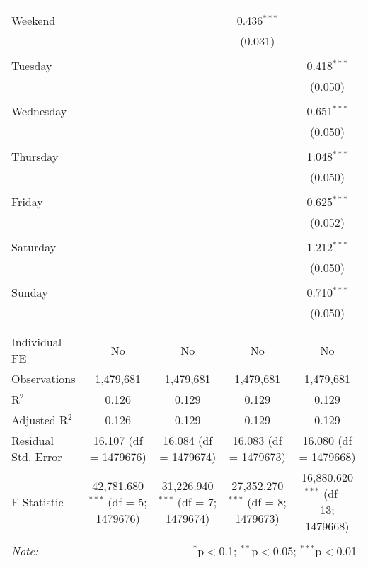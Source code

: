 \documentclass[
]{article}
\begin{document}
\begin{table}[!htbp]
{\begin{tabular}{@{\extracolsep{5pt}}lcccc}
  & & & & \\ 
 Weekend &  &  & 0.436$^{***}$ &  \\ 
  &  &  & (0.031) &  \\ 
  & & & & \\ 
 Tuesday &  &  &  & 0.418$^{***}$ \\ 
  &  &  &  & (0.050) \\ 
  & & & & \\ 
 Wednesday &  &  &  & 0.651$^{***}$ \\ 
  &  &  &  & (0.050) \\ 
  & & & & \\ 
 Thursday &  &  &  & 1.048$^{***}$ \\ 
  &  &  &  & (0.050) \\ 
  & & & & \\ 
 Friday &  &  &  & 0.625$^{***}$ \\ 
  &  &  &  & (0.052) \\ 
  & & & & \\ 
 Saturday &  &  &  & 1.212$^{***}$ \\ 
  &  &  &  & (0.050) \\ 
  & & & & \\ 
 Sunday &  &  &  & 0.710$^{***}$ \\ 
  &  &  &  & (0.050) \\ 
  & & & & \\ 
\hline \\[-1.8ex] 
Individual FE & No & No & No & No \\ 
Observations & 1,479,681 & 1,479,681 & 1,479,681 & 1,479,681 \\ 
R$^{2}$ & 0.126 & 0.129 & 0.129 & 0.129 \\ 
Adjusted R$^{2}$ & 0.126 & 0.129 & 0.129 & 0.129 \\ 
Residual Std. Error & 16.107 (df = 1479676) & 16.084 (df = 1479674) & 16.083 (df = 1479673) & 16.080 (df = 1479668) \\ 
F Statistic & 42,781.680$^{***}$ (df = 5; 1479676) & 31,226.940$^{***}$ (df = 7; 1479674) & 27,352.270$^{***}$ (df = 8; 1479673) & 16,880.620$^{***}$ (df = 13; 1479668) \\ 
\hline 
\hline \\[-1.8ex] 
\textit{Note:}  & \multicolumn{4}{r}{$^{*}$p$<$0.1; $^{**}$p$<$0.05; $^{***}$p$<$0.01} \\ 
\end{tabular}
} 
\end{table} 
\newpage
\end{document}
